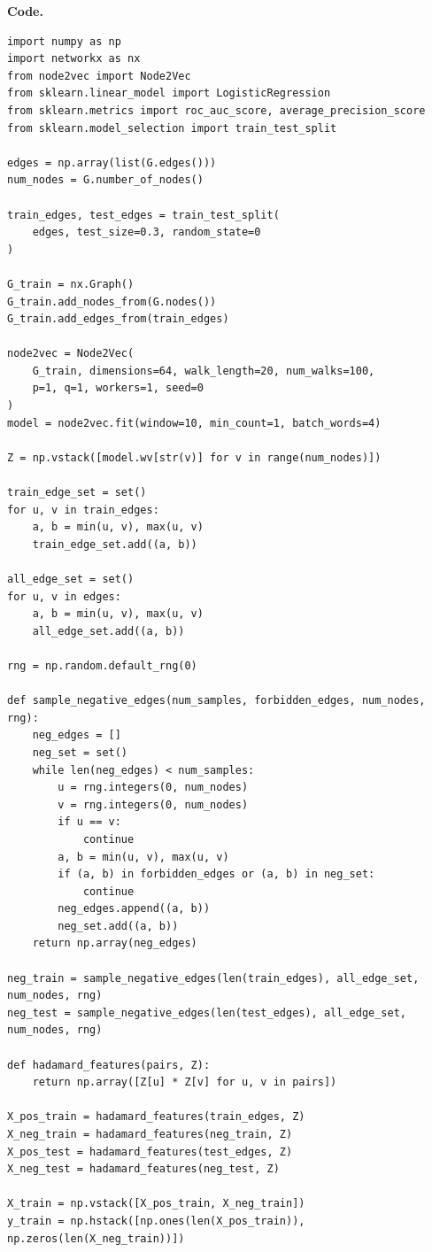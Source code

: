 \documentclass{article}
\begin{document}
\begin{tcolorbox}[colback=white, colframe=black!75, breakable, title=\textbf{Solution to Exercise 1}]
\medskip
\textbf{Code.}
\begin{lstlisting}[style=python2]
import numpy as np
import networkx as nx
from node2vec import Node2Vec
from sklearn.linear_model import LogisticRegression
from sklearn.metrics import roc_auc_score, average_precision_score
from sklearn.model_selection import train_test_split

edges = np.array(list(G.edges()))
num_nodes = G.number_of_nodes()

train_edges, test_edges = train_test_split(
    edges, test_size=0.3, random_state=0
)

G_train = nx.Graph()
G_train.add_nodes_from(G.nodes())
G_train.add_edges_from(train_edges)

node2vec = Node2Vec(
    G_train, dimensions=64, walk_length=20, num_walks=100,
    p=1, q=1, workers=1, seed=0
)
model = node2vec.fit(window=10, min_count=1, batch_words=4)

Z = np.vstack([model.wv[str(v)] for v in range(num_nodes)])

train_edge_set = set()
for u, v in train_edges:
    a, b = min(u, v), max(u, v)
    train_edge_set.add((a, b))

all_edge_set = set()
for u, v in edges:
    a, b = min(u, v), max(u, v)
    all_edge_set.add((a, b))

rng = np.random.default_rng(0)

def sample_negative_edges(num_samples, forbidden_edges, num_nodes, rng):
    neg_edges = []
    neg_set = set()
    while len(neg_edges) < num_samples:
        u = rng.integers(0, num_nodes)
        v = rng.integers(0, num_nodes)
        if u == v:
            continue
        a, b = min(u, v), max(u, v)
        if (a, b) in forbidden_edges or (a, b) in neg_set:
            continue
        neg_edges.append((a, b))
        neg_set.add((a, b))
    return np.array(neg_edges)

neg_train = sample_negative_edges(len(train_edges), all_edge_set, num_nodes, rng)
neg_test = sample_negative_edges(len(test_edges), all_edge_set, num_nodes, rng)

def hadamard_features(pairs, Z):
    return np.array([Z[u] * Z[v] for u, v in pairs])

X_pos_train = hadamard_features(train_edges, Z)
X_neg_train = hadamard_features(neg_train, Z)
X_pos_test = hadamard_features(test_edges, Z)
X_neg_test = hadamard_features(neg_test, Z)

X_train = np.vstack([X_pos_train, X_neg_train])
y_train = np.hstack([np.ones(len(X_pos_train)), np.zeros(len(X_neg_train))])


\end{lstlisting}
\end{tcolorbox}
\end{document}
